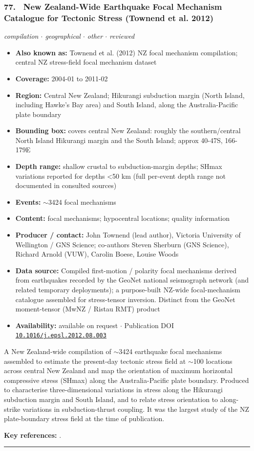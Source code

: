 \documentclass[10pt,a4paper]{article}
\newcommand{\catentryrule}{\par\vspace{3pt}\noindent\textcolor{rulegrey}{\rule{\linewidth}{0.3pt}}\par\vspace{5pt}}
\newcommand{\kv}[2]{\item \textbf{#1:} #2}
\begin{document}
\subsubsection*{\hypertarget{c:77}{77.}~ New Zealand-Wide Earthquake Focal Mechanism Catalogue for Tectonic Stress (Townend et al. 2012)}
{\small\itshape compilation $\cdot$ geographical $\cdot$ other $\cdot$ reviewed}\par\vspace{2pt}
\begin{itemize}[leftmargin=1.3em,itemsep=0.6pt,topsep=1pt,parsep=0pt]
\kv{Also known as}{Townend et al. (2012) NZ focal mechanism compilation; central NZ stress-field focal mechanism dataset}
\kv{Coverage}{2004-01 to 2011-02}
\kv{Region}{Central New Zealand; Hikurangi subduction margin (North Island, including Hawke's Bay area) and South Island, along the Australia-Pacific plate boundary}
\kv{Bounding box}{covers central New Zealand: roughly the southern/central North Island Hikurangi margin and the South Island; approx 40-47S, 166-179E}
\kv{Depth range}{shallow crustal to subduction-margin depths; SHmax variations reported for depths \textless{}50 km (full per-event depth range not documented in consulted sources)}
\kv{Events}{$\sim$3424 focal mechanisms}
\kv{Content}{focal mechanisms; hypocentral locations; quality information}
\kv{Producer / contact}{John Townend (lead author), Victoria University of Wellington / GNS Science; co-authors Steven Sherburn (GNS Science), Richard Arnold (VUW), Carolin Boese, Louise Woods}
\kv{Data source}{Compiled first-motion / polarity focal mechanisms derived from earthquakes recorded by the GeoNet national seismograph network (and related temporary deployments); a purpose-built NZ-wide focal-mechanism catalogue assembled for stress-tensor inversion. Distinct from the GeoNet moment-tensor (MwNZ / Ristau RMT) product}
\kv{Availability}{available on request $\cdot$ Publication DOI \href{https://doi.org/10.1016/j.epsl.2012.08.003}{\nolinkurl{10.1016/j.epsl.2012.08.003}}}
\end{itemize}
\par\vspace{2pt}A New Zealand-wide compilation of $\sim$3424 earthquake focal mechanisms assembled to estimate the present-day tectonic stress field at $\sim$100 locations across central New Zealand and map the orientation of maximum horizontal compressive stress (SHmax) along the Australia-Pacific plate boundary. Produced to characterise three-dimensional variations in stress along the Hikurangi subduction margin and South Island, and to relate stress orientation to along-strike variations in subduction-thrust coupling. It was the largest study of the NZ plate-boundary stress field at the time of publication.
\par\vspace{2pt}\textbf{Key references:} \cite{Townend2012}.
\catentryrule
\end{document}
